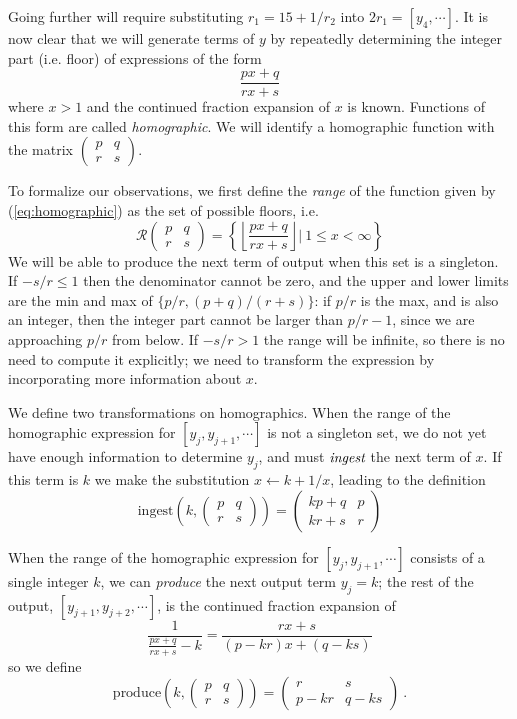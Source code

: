 \documentclass[11pt, oneside]{amsart}   	%
\newcommand{\pqrs}{\left(
\begin{smallmatrix} 
p & q\\ 
r & s 
\end{smallmatrix}
\right)}
\newcommand{\homographic}[4]{\begin{pmatrix} #1 & #2\\ #3 & #4 \end{pmatrix}}
\begin{document}
Going further will require substituting $r_1 = 15+1/r_2$ into $2r_1 = [y_4,\cdots]$.
It is now clear that we will generate terms of $y$ by repeatedly determining the integer part (i.e. floor) of expressions of the form
\begin{equation}\label{eq:homographic}
\frac{px+q}{rx+s}
\end{equation}
where $x>1$ and the continued fraction expansion of $x$ is known. Functions of this form are called \emph{homographic}.
We will identify a homographic function with the matrix
$\left(
\begin{smallmatrix} 
p & q\\ 
r & s 
\end{smallmatrix}
\right)$.

To formalize our observations, we first define the \emph{range} of the function given by (\ref{eq:homographic})
as the set of possible floors, i.e.
\begin{equation}
\mathcal{R}\pqrs = \left\{ \left\lfloor \frac{px+q}{rx+s} \right\rfloor | \  1 \leq x < \infty \right\}
\end{equation}
We will be able to produce the next term of output when this set is a singleton. If $-s/r \leq 1$ then the denominator cannot be zero,
and the upper and lower limits are the min and max of $\{p/r, (p+q)/(r+s)\}$: if $p/r$ is the max, and is also an integer, then the
integer part cannot be larger than $p/r-1$, since we are approaching $p/r$ from below. If  $-s/r > 1$ the range will be infinite, so
there is no need to compute it explicitly; we need to transform the expression by incorporating more information about $x$.

We define two transformations on homographics. When the range of the homographic expression for $[y_j,y_{j+1},\cdots]$ is not a
singleton set, we do not yet have enough information to determine $y_j$, and must $\emph{ingest}$ the next term of $x$. If this term
is $k$ we make the substitution $x \leftarrow k + 1/x$, leading to the definition
\begin{equation}
\mbox{ingest}(k,\pqrs) = \homographic{kp+q}{p}{kr+s}{r}%
\end{equation}

When the range of the homographic expression for $[y_j,y_{j+1},\cdots]$ consists of a single integer $k$, we can \emph{produce}
the next output term $y_j = k$; the rest of the output, $[y_{j+1},y_{j+2},\cdots]$, is the continued fraction expansion of
\[
\frac{1}{\frac{px+q}{rx+s}-k} = \frac{rx+s}{(p-kr)x + (q-ks)}
\] 
so we define 
\begin{equation}
\mbox{produce}(k,\pqrs) = \homographic{r}{s}{p-kr}{q-ks}\ .
\end{equation}
\end{document}
